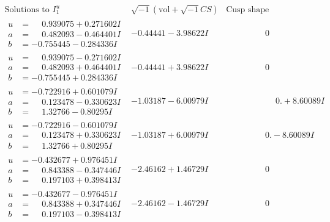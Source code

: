 \documentclass[1p]{elsarticle_modified}
\theoremstyle{definition}
\newcommand{\I}{\sqrt{-1}}
\begin{document}
$$\begin{array}{c|c|c}  
\text{Solutions to }I^u_{1}& \I (\text{vol} + \sqrt{-1}CS) & \text{Cusp shape}\\
 \hline 
\begin{aligned}
u &= \phantom{-}0.939075 + 0.271602 I \\
a &= \phantom{-}0.482093 - 0.464401 I \\
b &= -0.755445 - 0.284336 I\end{aligned}
 & -0.44441 - 3.98622 I & \phantom{-0.000000 } 0 \\ \hline\begin{aligned}
u &= \phantom{-}0.939075 - 0.271602 I \\
a &= \phantom{-}0.482093 + 0.464401 I \\
b &= -0.755445 + 0.284336 I\end{aligned}
 & -0.44441 + 3.98622 I & \phantom{-0.000000 } 0 \\ \hline\begin{aligned}
u &= -0.722916 + 0.601079 I \\
a &= \phantom{-}0.123478 - 0.330623 I \\
b &= \phantom{-}1.32766 - 0.80295 I\end{aligned}
 & -1.03187 - 6.00979 I & \phantom{-0.000000 -}0. + 8.60089 I \\ \hline\begin{aligned}
u &= -0.722916 - 0.601079 I \\
a &= \phantom{-}0.123478 + 0.330623 I \\
b &= \phantom{-}1.32766 + 0.80295 I\end{aligned}
 & -1.03187 + 6.00979 I & \phantom{-0.000000 } 0. - 8.60089 I \\ \hline\begin{aligned}
u &= -0.432677 + 0.976451 I \\
a &= \phantom{-}0.843388 - 0.347446 I \\
b &= \phantom{-}0.197103 + 0.398413 I\end{aligned}
 & -2.46162 + 1.46729 I & \phantom{-0.000000 } 0 \\ \hline\begin{aligned}
u &= -0.432677 - 0.976451 I \\
a &= \phantom{-}0.843388 + 0.347446 I \\
b &= \phantom{-}0.197103 - 0.398413 I\end{aligned}
 & -2.46162 - 1.46729 I & \phantom{-0.000000 } 0 \\ \hline\begin{aligned}

\end{aligned}
\end{array}$$
\end{document}
